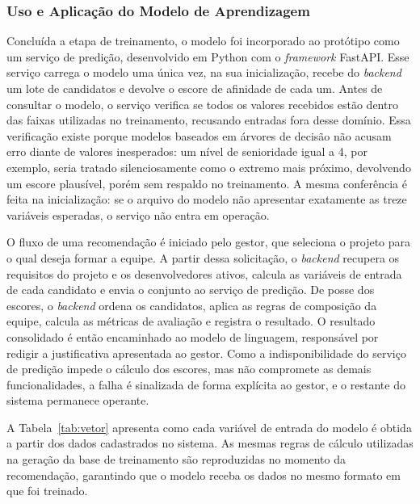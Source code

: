 \subsubsection{Uso e Aplicação do Modelo de Aprendizagem}

Concluída a etapa de treinamento, o modelo foi incorporado ao protótipo como um serviço de predição, desenvolvido em Python com o \textit{framework} FastAPI. Esse serviço carrega o modelo uma única vez, na sua inicialização, recebe do \textit{backend} um lote de candidatos e devolve o escore de afinidade de cada um. Antes de consultar o modelo, o serviço verifica se todos os valores recebidos estão dentro das faixas utilizadas no treinamento, recusando entradas fora desse domínio. Essa verificação existe porque modelos baseados em árvores de decisão não acusam erro diante de valores inesperados: um nível de senioridade igual a 4, por exemplo, seria tratado silenciosamente como o extremo mais próximo, devolvendo um escore plausível, porém sem respaldo no treinamento. A mesma conferência é feita na inicialização: se o arquivo do modelo não apresentar exatamente as treze variáveis esperadas, o serviço não entra em operação.

O fluxo de uma recomendação é iniciado pelo gestor, que seleciona o projeto para o qual deseja formar a equipe. A partir dessa solicitação, o \textit{backend} recupera os requisitos do projeto e os desenvolvedores ativos, calcula as variáveis de entrada de cada candidato e envia o conjunto ao serviço de predição. De posse dos escores, o \textit{backend} ordena os candidatos, aplica as regras de composição da equipe, calcula as métricas de avaliação e registra o resultado. O resultado consolidado é então encaminhado ao modelo de linguagem, responsável por redigir a justificativa apresentada ao gestor. Como a indisponibilidade do serviço de predição impede o cálculo dos escores, mas não compromete as demais funcionalidades, a falha é sinalizada de forma explícita ao gestor, e o restante do sistema permanece operante.

A Tabela~\ref{tab:vetor} apresenta como cada variável de entrada do modelo é obtida a partir dos dados cadastrados no sistema. As mesmas regras de cálculo utilizadas na geração da base de treinamento são reproduzidas no momento da recomendação, garantindo que o modelo receba os dados no mesmo formato em que foi treinado.

